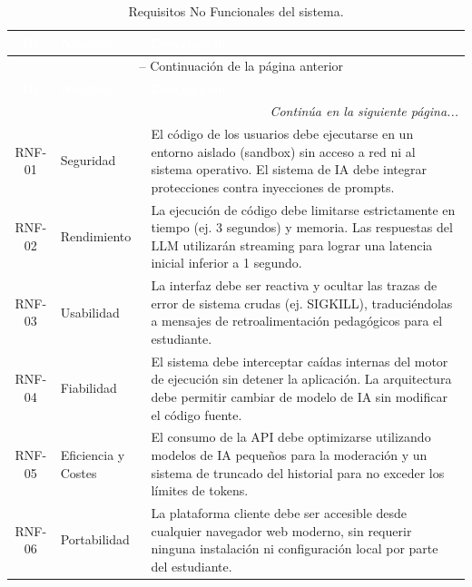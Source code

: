 \begingroup
\setlength{\arrayrulewidth}{1pt}
\begin{longtable}{|c|p{3.5cm}|p{9cm}|}
  \caption{Requisitos No Funcionales del sistema.}
  \label{TB:REQ_NO_FUNC} \\
  
  \hline
  \rowcolor{maincolor} 
  \textcolor{white}{\textbf{ID}} & \textcolor{white}{\textbf{Nombre}} & \textcolor{white}{\textbf{Descripción}} \\
  \hline
  \endfirsthead
  
  \multicolumn{3}{c}{{\tablename\ \thetable{} -- Continuación de la página anterior}} \\
  \hline
  \rowcolor{maincolor} 
  \textcolor{white}{\textbf{ID}} & \textcolor{white}{\textbf{Nombre}} & \textcolor{white}{\textbf{Descripción}} \\
  \hline
  \endhead
  
  \hline \multicolumn{3}{|r|}{\textit{Continúa en la siguiente página...}} \\ \hline
  \endfoot
  
  \hline
  \endlastfoot

  \rowcolor{ulepsbased} RNF-01 & Seguridad & El código de los usuarios debe ejecutarse en un entorno aislado (sandbox) sin acceso a red ni al sistema operativo. El sistema de IA debe integrar protecciones contra inyecciones de prompts. \\ \hline
  RNF-02 & Rendimiento & La ejecución de código debe limitarse estrictamente en tiempo (ej. 3 segundos) y memoria. Las respuestas del LLM utilizarán streaming para lograr una latencia inicial inferior a 1 segundo. \\ \hline
  \rowcolor{ulepsbased} RNF-03 & Usabilidad & La interfaz debe ser reactiva y ocultar las trazas de error de sistema crudas (ej. SIGKILL), traduciéndolas a mensajes de retroalimentación pedagógicos para el estudiante. \\ \hline
  RNF-04 & Fiabilidad & El sistema debe interceptar caídas internas del motor de ejecución sin detener la aplicación. La arquitectura debe permitir cambiar de modelo de IA sin modificar el código fuente. \\ \hline
  \rowcolor{ulepsbased} RNF-05 & Eficiencia y Costes & El consumo de la API debe optimizarse utilizando modelos de IA pequeños para la moderación y un sistema de truncado del historial para no exceder los límites de tokens. \\ \hline
  RNF-06 & Portabilidad & La plataforma cliente debe ser accesible desde cualquier navegador web moderno, sin requerir ninguna instalación ni configuración local por parte del estudiante. \\ \hline
\end{longtable}
\endgroup